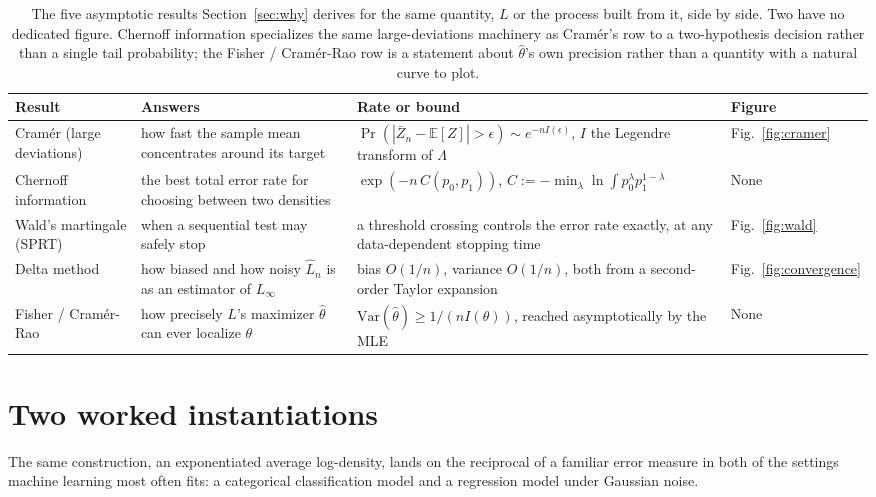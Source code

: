 \documentclass[11pt]{article}
\begin{document}
\begin{table}[H]
\centering
\footnotesize
\begin{tabular}{@{}p{2.6cm}p{4.4cm}p{4.7cm}p{2.1cm}@{}}
\toprule
Result & Answers & Rate or bound & Figure \\
\midrule
Cram\'er (large \mbox{deviations}) & how fast the sample mean
  \mbox{concentrates} around its target & $\Pr(|\bar Z_n-\mathbb E[Z]|>\epsilon) \sim
  e^{-nI(\epsilon)}$, $I$ the Legendre transform of $\Lambda$ &
  Fig.~\ref{fig:cramer} \\
Chernoff information & the best total error rate for choosing between
  two densities & $\exp(-n\,C(p_0,p_1))$, $C := -\min_\lambda \ln\int
  p_0^\lambda p_1^{1-\lambda}$ & None \\
Wald's martingale (SPRT) & when a sequential test may safely stop &
  a threshold crossing controls the error rate exactly, at any
  data-dependent stopping time & Fig.~\ref{fig:wald} \\
Delta method & how biased and how noisy $\hat L_n$ is as an estimator
  of $L_\infty$ & bias $O(1/n)$, variance $O(1/n)$, both from a
  second-order Taylor expansion & Fig.~\ref{fig:convergence} \\
Fisher / Cram\'er-Rao & how precisely $L$'s maximizer $\hat\theta$ can
  ever localize $\theta$ & $\mathrm{Var}(\hat\theta) \ge 1/(nI(\theta))$,
  reached asymptotically by the MLE & None \\
\bottomrule
\end{tabular}
\caption{The five asymptotic results Section~\ref{sec:why} derives for
the same quantity, $L$ or the process built from it, side by side.
Two have no dedicated figure. Chernoff information specializes the same
large-deviations machinery as Cram\'er's row to a two-hypothesis
decision rather than a single tail probability; the Fisher /
Cram\'er-Rao row is a statement about $\hat\theta$'s own precision
rather than a quantity with a natural curve to plot.}
\label{tab:asymptotics}
\end{table}

\clearpage


\section{Two worked instantiations}
\label{sec:worked}

The same construction, an exponentiated average log-density, lands on
the reciprocal of a familiar error measure in both of the settings
machine learning most often fits: a categorical classification model and
a regression model under Gaussian noise.
\end{document}

